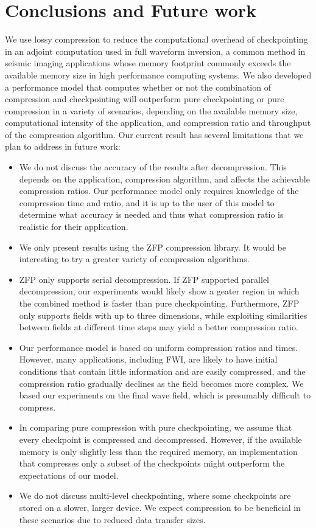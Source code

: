 \documentclass[conference]{IEEEtran}
\begin{document}
\section{Conclusions and Future work}
We use lossy compression to reduce the computational overhead of
checkpointing in an adjoint computation used in full waveform
inversion, a common method in seismic imaging applications whose
memory footprint commonly exceeds the available memory size in high
performance computing systems. We also developed a performance model
that computes whether or not the combination of compression and
checkpointing will outperform pure checkpointing or pure compression
in a variety of scenarios, depending on the available memory size,
computational intensity of the application, and compression ratio and
throughput of the compression algorithm. Our current result has
several limitations that we plan to address in future work:
\begin{itemize}
\item We do not discuss the accuracy of the results after decompression. This
depends on the application, compression algorithm, and affects the achievable
compression ratios. Our performance model only requires knowledge of the
compression time and ratio, and it is up to the user of this model to determine
what accuracy is needed and thus what compression ratio is realistic for their
application.
\item We only present results using the ZFP compression library. It
would be interesting to try a greater variety of compression
algorithms.
\item ZFP only supports serial decompression. If ZFP supported
parallel decompression, our experiments would likely show a geater region in
which the combined method is faster than pure checkpointing. Furthermore, ZFP
only supports fields with up to three dimensions, while
exploiting similarities between fields at different time steps may yield a
better compression ratio.
\item Our performance model is based on uniform compression ratios and
times.  However, many applications, including FWI, are likely to have
initial conditions that contain little information and are easily
compressed, and the compression ratio gradually declines as the field
becomes more complex. We based our experiments on the final wave
field, which is presumably difficult to compress.
\item In comparing pure compression with pure checkpointing, we assume
that every checkpoint is compressed and decompressed. However, if the
available memory is only slightly less than the required memory, an
implementation that compresses only a subset of the checkpoints might
outperform the expectations of our model.
\item We do not discuss multi-level checkpointing, where some
checkpoints are stored on a slower, larger device. We expect
compression to be beneficial in these scenarios due to reduced data
transfer sizes.
\end{itemize}
\end{document}
